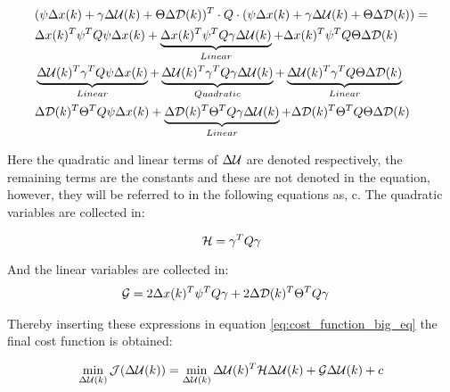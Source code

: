 \begin{equation}\label{eq:cost_function_big_eq}
	\begin{aligned}
	&(\psi\Delta x(k) + \gamma\Delta \CMcal{U}(k) + \Theta\Delta \CMcal{D}(k))^T\cdot Q \cdot (\psi\Delta x(k) + \gamma\Delta \CMcal{U}(k) + \Theta\Delta \CMcal{D}(k)) = \\
	& \Delta x(k)^T\psi ^T Q \psi \Delta x(k) 								+ \underbrace{\Delta x(k)^T \psi ^T Q \gamma \Delta  \CMcal{U}(k) }_{Linear}				+\Delta x(k)^T \psi ^T Q \Theta \Delta \CMcal{D}(k) \\
	& \underbrace{\Delta \CMcal{U}(k)^T \gamma ^T Q \psi\Delta x(k)}_{Linear} + \underbrace{\Delta \CMcal{U}(k)^T\gamma ^T Q \gamma\Delta \CMcal{U}(k)}_{Quadratic} +\underbrace{\Delta \CMcal{U}(k)^T \gamma ^T Q\Theta \Delta \CMcal{D}(k)}_{Linear} \\ 
	& \Delta \CMcal{D}(k)^T \Theta ^T Q  \psi \Delta x(k)					+ \underbrace{\Delta \CMcal{D}(k)^T \Theta ^T Q \gamma  \Delta \CMcal{U}(k) }_{Linear}	+\Delta \CMcal{D}(k)^T \Theta ^T Q \Theta \Delta \CMcal{D}(k)
	\end{aligned}
\end{equation}

Here the quadratic and linear terms of $\Delta \CMcal{U}$ are denoted respectively, the remaining terms are the constants and these are not denoted in the equation, however, they will be referred to in the following equations as, c. The quadratic variables are collected in: 

\begin{equation}
	\CMcal{H} = \gamma^T Q\gamma 
\end{equation}

And the linear variables are collected in:
\begin{equation}
	\begin{aligned}
	\CMcal{G} &= 2 \Delta x(k)^T\psi^T Q \gamma+2 \Delta \CMcal{D}(k)^T\Theta^T Q \gamma 
	\end{aligned}
\end{equation}

Thereby inserting these expressions in equation \ref{eq:cost_function_big_eq} the final cost function is obtained:

\begin{equation}\label{eq:the_cost_function}
	\min_{\Delta \CMcal{U}(k)} \CMcal{J}(\Delta \CMcal{U}(k)) =\min_{\Delta \CMcal{U}(k)} \Delta \CMcal{U}(k)^T\CMcal{H}\Delta \CMcal{U}(k)+\CMcal{G}\Delta \CMcal{U}(k)+c
\end{equation}

